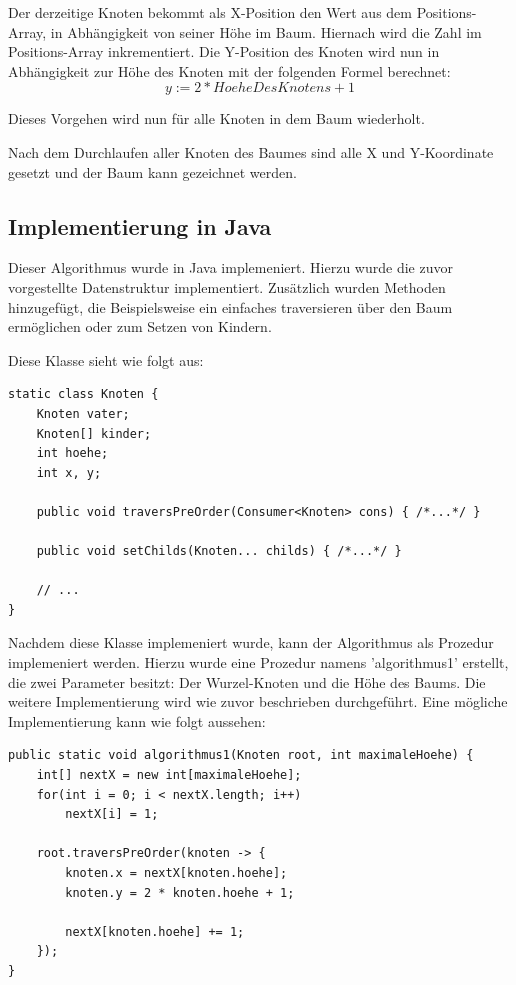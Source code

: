 Der derzeitige Knoten bekommt als X-Position den Wert aus dem Positions-Array, in Abhängigkeit von seiner Höhe im Baum.
Hiernach wird die Zahl im Positions-Array inkrementiert. Die Y-Position des Knoten wird nun in Abhängigkeit zur Höhe des Knoten
mit der folgenden Formel berechnet: $$y := 2 * HoeheDesKnotens + 1$$

Dieses Vorgehen wird nun für alle Knoten in dem Baum wiederholt. 

Nach dem Durchlaufen aller Knoten des Baumes sind alle X und Y-Koordinate gesetzt und der Baum kann gezeichnet werden.

\subsection{Implementierung in Java}
Dieser Algorithmus wurde in Java implemeniert. Hierzu wurde die zuvor vorgestellte Datenstruktur
implementiert. Zusätzlich wurden Methoden hinzugefügt, die Beispielsweise
ein einfaches traversieren über den Baum ermöglichen oder zum Setzen von Kindern.

Diese Klasse sieht wie folgt aus:

\begin{lstlisting}
static class Knoten {
	Knoten vater;
	Knoten[] kinder;
	int hoehe;
	int x, y;

	public void traversPreOrder(Consumer<Knoten> cons) { /*...*/ }

	public void setChilds(Knoten... childs) { /*...*/ }

	// ...
}
\end{lstlisting}

Nachdem diese Klasse implemeniert wurde, kann der Algorithmus als Prozedur implemeniert werden.
Hierzu wurde eine Prozedur namens 'algorithmus1' erstellt, die zwei Parameter besitzt: Der Wurzel-Knoten
und die Höhe des Baums. Die weitere Implementierung wird wie zuvor beschrieben durchgeführt. Eine mögliche Implementierung
kann wie folgt aussehen:

\begin{lstlisting}
public static void algorithmus1(Knoten root, int maximaleHoehe) {
	int[] nextX = new int[maximaleHoehe];
	for(int i = 0; i < nextX.length; i++)
		nextX[i] = 1;

	root.traversPreOrder(knoten -> {
		knoten.x = nextX[knoten.hoehe];
		knoten.y = 2 * knoten.hoehe + 1;
		
		nextX[knoten.hoehe] += 1;
	});
}
\end{lstlisting}

